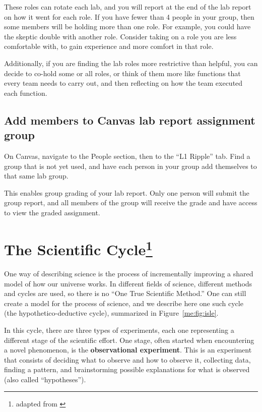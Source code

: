 These roles can rotate each lab, and you will report at the end of the lab report on how it went for each role. If you have fewer than 4 people in your group, then some members will be holding more than one role. For example, you could have the skeptic double with another role. Consider taking on a role you are less comfortable with, to gain experience and more comfort in that role.

Additionally, if you are finding the lab roles more restrictive than helpful, you can decide to co-hold some or all roles, or think of them more like functions that every team needs to carry out, and then reflecting on how the team executed each function.

\subsection{Add members to Canvas lab report assignment group}

\begin{steps}
\item On Canvas, navigate to the People section, then to the ``L1 Ripple'' tab. Find a group that is not yet used, and have each person in your group add themselves to that same lab group.
\end{steps}

This enables group grading of your lab report. Only one person will submit the group report, and all members of the group will receive the grade and have access to view the graded assignment.

\section{The Scientific Cycle\protect\footnote{adapted from \cite{etkina_college_2014}}}

One way of describing science is the process of incrementally improving a shared model of how our universe works. In different fields of science, different methods and cycles are used, so there is no ``One True Scientific Method.'' One can still create a model for the process of science, and we describe here one such cycle (the hypothetico-deductive cycle), summarized in Figure~\ref{me:fig:isle}.

In this cycle, there are three types of experiments, each one representing a different stage of the scientific effort. One stage, often started when encountering a novel phenomenon, is the \textbf{observational experiment}. This is an experiment that consists of deciding what to observe and how to observe it, collecting data, finding a pattern, and brainstorming possible explanations for what is observed (also called ``hypotheses'').

